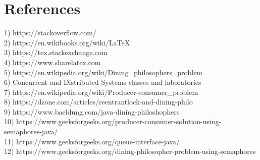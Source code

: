 \documentclass[14pt]{article}
\begin{document}
\section{References}
1) https://stackoverflow.com/
\vspace{2.5 mm}
\\2) https://en.wikibooks.org/wiki/LaTeX
\vspace{2.5 mm}
\\3) https://tex.stackexchange.com
\vspace{2.5 mm}
\\4) https://www.sharelatex.com 
\vspace{2.5 mm}
\\5) https://en.wikipedia.org/wiki/Dining\_philosophers\_problem
\vspace{2.5 mm}
\\6) Concurrent and Distributed Systems classes and laboratories
\vspace{2.5 mm}
\\7) https://en.wikipedia.org/wiki/Producer-consumer\_problem
\vspace{2.5 mm}
\\8) https://dzone.com/articles/reentrantlock-and-dining-philo
\vspace{2.5 mm}
\\9) https://www.baeldung.com/java-dining-philoshophers
\vspace{2.5 mm}
\\10) https://www.geeksforgeeks.org/producer-consumer-solution-using-semaphores-java/
\vspace{2.5 mm}
\\11) https://www.geeksforgeeks.org/queue-interface-java/
\vspace{2.5 mm}
\\12) https://www.geeksforgeeks.org/dining-philosopher-problem-using-semaphores
\end{document}
